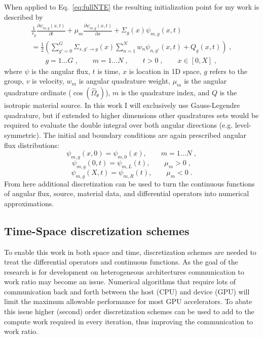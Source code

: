 When applied to Eq.~\eqref{eq:fullNTE} the resulting initialization point for my work is described by
\begin{multline}
    \label{eq:sn_nte}
    \frac{1}{v_g} \frac{\partial \psi_{m,g}(x,t)}{\partial t} + \mu_m \frac{\partial \psi_{m,g}(x,t)}{\partial x} + \Sigma_g(x) \psi_{m,g}(x,t)  \\
     = \frac{1}{2} \left( \sum\limits_{g' = 0}^G \Sigma_{s, g'\to g}(x) \sum\limits_{n=1}^N w_n \psi_{n, g'}(x,t) + Q_g(x,t) \right) \;, \\
    \qquad g=1 \ldots G \;, \qquad m=1 \ldots N \;, \qquad t > 0 \;, \qquad x \in [0,X] \;,
\end{multline}
where $\psi$ is the angular flux, $t$ is time, $x$ is location in 1D space, $g$ refers to the group, $v$ is velocity, $w_m$ is angular quadrature weight, $\mu_m$ is the angular quadrature ordinate ($\cos(\hat{\Omega}_\theta)$), $m$ is the quadrature index, and $Q$ is the isotropic material source.
In this work I will exclusively use Gauss-Legendre quadrature, but if extended to higher dimensions other quadratures sets would be required to evaluate the double integral over both angular directions (e.g. level-symmetric). 
The initial and boundary conditions are again prescribed angular flux distributions:
\begin{equation*}
    \psi_{m,g}(x,0) = \psi_{m,0}(x), \qquad m=1 \ldots N \;,
\end{equation*}
\begin{equation*}
    \psi_{m,g}(0,t) = \psi_{m,L}(t), \qquad \mu_m >0 \;,
\end{equation*}
\begin{equation*}
    \psi_{m,g}(X,t) = \psi_{m,R}(t), \qquad \mu_m <0 \;.
\end{equation*}
From here additional discretization can be used to turn the continuous functions of angular flux, source, material data, and differential operators into numerical approximations.

\subsection{Time-Space discretization schemes}

To enable this work in both space and time, discretization schemes are needed to treat the differential operators and continuous functions.
As the goal of the research is for development on heterogeneous architectures communication to work ratio may become an issue.
Numerical algorithms that require lots of communication back and forth between the host (CPU) and device (GPU) will limit the maximum allowable performance for most GPU accelerators.
To abate this issue higher (second) order discretization schemes can be used to add to the compute work required in every iteration, thus improving the communication to work ratio.

